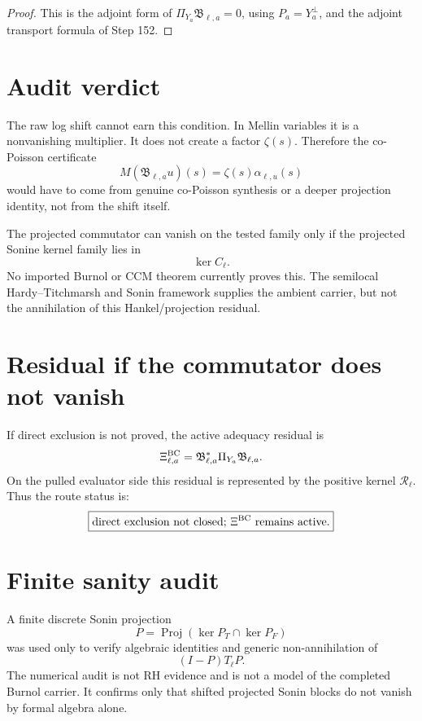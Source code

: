 \documentclass[11pt]{article}
\begin{document}
\begin{proof}
This is the adjoint form of
\(\Pi_{Y_a}\mathfrak B_{\ell,a}=0\), using
\(P_a=Y_a^\perp\), and the adjoint transport formula of Step 152.
\end{proof}

\section{Audit verdict}
The raw log shift cannot earn this condition.  In Mellin variables it is a nonvanishing multiplier.
It does not create a factor \(\zeta(s)\).  Therefore the co-Poisson certificate
\[
  M(\mathfrak B_{\ell,a}u)(s)=\zeta(s)\alpha_{\ell,u}(s)
\]
would have to come from genuine co-Poisson synthesis or a deeper projection identity, not from the shift itself.

The projected commutator can vanish on the tested family only if the projected Sonine kernel family lies in
\[
  \ker C_\ell.
\]
No imported Burnol or CCM theorem currently proves this.  The semilocal Hardy--Titchmarsh and Sonin framework supplies the ambient carrier, but not the annihilation of this Hankel/projection residual.

\section{Residual if the commutator does not vanish}
If direct exclusion is not proved, the active adequacy residual is
\[
  \Xi^{\rm BC}_{\ell,a}
  =\mathfrak B_{\ell,a}^*\Pi_{Y_a}\mathfrak B_{\ell,a}.
\]
On the pulled evaluator side this residual is represented by the positive kernel \(\mathcal R_\ell\).
Thus the route status is:
\[
  \boxed{\text{direct exclusion not closed; }\Xi^{\rm BC}\text{ remains active.}}
\]

\section{Finite sanity audit}
A finite discrete Sonin projection
\[
  P=\operatorname{Proj}(\ker P_T\cap\ker P_F)
\]
was used only to verify algebraic identities and generic non-annihilation of
\[
  (I-P)T_\ell P.
\]
The numerical audit is not RH evidence and is not a model of the completed Burnol carrier.
It confirms only that shifted projected Sonin blocks do not vanish by formal algebra alone.
\end{document}
